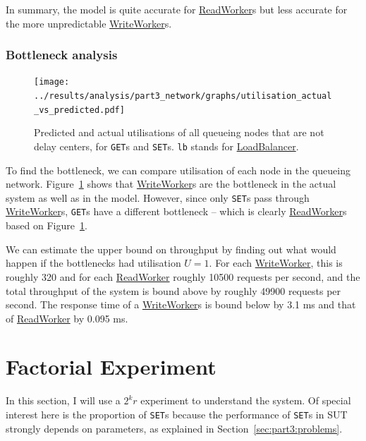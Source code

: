 \documentclass[11pt]{article}
\newcommand{\get}[0]{\texttt{GET}}
\newcommand{\set}[0]{\texttt{SET}}
\newcommand{\linkmain}[1]{\href{https://gitlab.inf.ethz.ch/pungast/asl-fall16-project/blob/master/src/main/java/asl/#1.java}{#1}}
\begin{document}
In summary, the model is quite accurate for \linkmain{ReadWorker}s but less accurate for the more unpredictable \linkmain{WriteWorker}s.


\subsubsection{Bottleneck analysis}

\begin{figure}[h]
\centering
\texttt{[image: ../results/analysis/part3\_network/graphs/utilisation\_actual\_vs\_predicted.pdf]}
\caption{Predicted and actual utilisations of all queueing nodes that are not delay centers, for \get{}s and \set{}s. \texttt{lb} stands for \linkmain{LoadBalancer}.}
\label{fig:part3:utilisation}
\end{figure}

To find the bottleneck, we can compare utilisation of each node in the queueing network. Figure~\ref{fig:part3:utilisation} shows that \linkmain{WriteWorker}s are the bottleneck in the actual system as well as in the model. However, since only \set{}s pass through \linkmain{WriteWorker}s, \get{}s have a different bottleneck -- which is clearly \linkmain{ReadWorker}s based on Figure~\ref{fig:part3:utilisation}.

We can estimate the upper bound on throughput by finding out what would happen if the bottlenecks had utilisation $U=1$. For each \linkmain{WriteWorker}, this is roughly 320 and for each \linkmain{ReadWorker} roughly 10500 requests per second, and the total throughput of the system is bound above by roughly 49900 requests per second. The response time of a \linkmain{WriteWorker}s is bound below by 3.1 ms and that of \linkmain{ReadWorker} by 0.095 ms.




\clearpage
\section{Factorial Experiment}\label{sec:part4-2k-experiment}

In this section, I will use a $2^kr$ experiment to understand the system. Of special interest here is the proportion of \set{}s because the performance of \set{}s in SUT strongly depends on parameters, as explained in Section~\ref{sec:part3:problems}.
\end{document}
